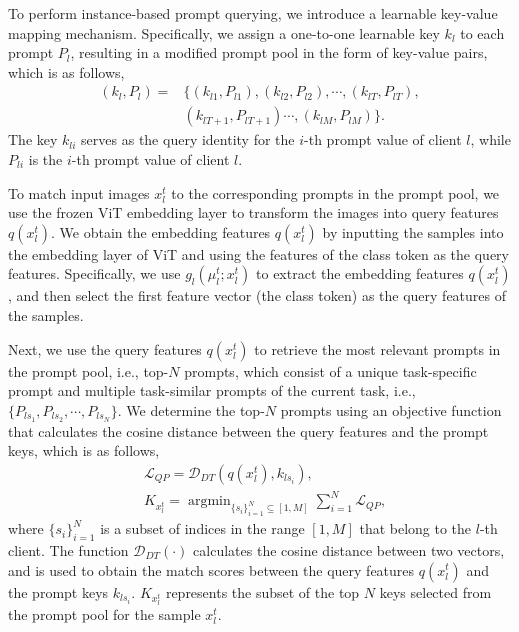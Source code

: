 \documentclass[sigconf,anonymous,review,screen]{acmart}
\begin{document}
To perform instance-based prompt querying, we introduce a learnable key-value mapping mechanism. Specifically, we assign a one-to-one learnable key $k_{l}$ to each prompt $P_l$, resulting in a modified prompt pool in the form of key-value pairs, which is as follows, 
\begin{equation}\label{eqn-4}
	\begin{aligned}
		(k_l, P_l) = &\{ (k_{l1}, P_{l1}), (k_{l2}, P_{l2}), \cdots, (k_{lT}, P_{lT}), \\
		&(k_{lT+1}, P_{lT+1}) \cdots, (k_{lM}, P_{lM}) \}.
	\end{aligned}
\end{equation}
The key $k_{li}$ serves as the query identity for the $i$-th prompt value of client $l$, while $P_{li}$ is the $i$-th prompt value of client $l$.

To match input images $x_{l}^t$ to the corresponding prompts in the prompt pool, we use the frozen ViT embedding layer to transform the images into query features $q(x_{l}^t)$. We obtain the embedding features $q(x_{l}^t)$ by inputting the samples into the embedding layer of ViT and using the features of the class token as the query features. Specifically, we use $g_l(\mu_l^t;x_{l}^t)$ to extract the embedding features $q(x_{l}^t)$, and then select the first feature vector (the class token) as the query features of the samples.

Next, we use the query features $q(x_{l}^t)$ to retrieve the most relevant prompts in the prompt pool, i.e., top-$N$ prompts, which consist of a unique task-specific prompt and multiple task-similar prompts of the current task, i.e., $\{P_{ls_1}, P_{ls_2}, \cdots, P_{ls_N}\}$. We determine the top-$N$ prompts using an objective function that calculates the cosine distance between the query features and the prompt keys, which is as follows,
\begin{equation}\label{eqn-5}
	\begin{aligned}
		&\mathcal{L}_{QP} = \mathcal{D}_{DT}(q(x_{l}^t), k_{ls_i}), \\
		&K_{x_{l}^t} = \mathop{\arg\min}_{\{s_i\}_{i=1}^N \subseteq [1, M]} \sum_{i=1}^N \mathcal{L}_{QP},
	\end{aligned}
\end{equation}
where $\{s_i\}_{i=1}^N$ is a subset of indices in the range $[1, M]$ that belong to the $l$-th client. The function $\mathcal{D}_{DT}(\cdot)$ calculates the cosine distance between two vectors, and is used to obtain the match scores between the query features $q(x_l^t)$ and the prompt keys $k_{ls_i}$. $K_{x_{l}^t}$ represents the subset of the top $N$ keys selected from the prompt pool for the sample $x_l^t$.
\end{document}
